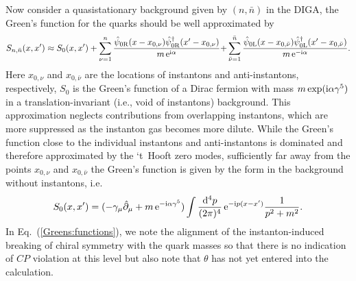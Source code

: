 \documentclass[review]{elsarticle}
\numberwithin{equation}{section}
\numberwithin{table}{section}
\numberwithin{figure}{section}
\begin{document}
Now consider a quasistationary background given by $(n,\bar{n})$ in the DIGA, the Green's function for the quarks should be well approximated by~\cite{Diakonov:1985eg}
\begin{align}
    S_{n,\bar n}(x,x^{\prime})\approx S_{0}(x,x^{\prime})+\sum_{\nu=1}^n\frac{\hat\psi_{0{\rm R}}(x-x_{0,\nu}){\hat\psi^\dagger_{0{\rm R}}}(x^{\prime}-x_{0,\nu})}{m\, {\rm e}^{{\rm i}\alpha}}{+}\sum_{\bar\nu=1}^{\bar n}\frac{\hat\psi_{0{\rm L}}(x-x_{0,\bar\nu}){\hat\psi^\dagger_{0{\rm L}}}(x^{\prime}-x_{0,\bar \nu})}{m\, {\rm e}^{-{\rm i}\alpha}}. 
    \label{Greens:functions}
\end{align}
Here $x_{0,\nu}$ and $x_{0,\bar\nu}$ are the locations of instantons and anti-instantons, respectively, $S_{0}$ is the Green's function of a Dirac fermion with mass $m \exp({\rm i}\alpha\gamma^5)$ in a translation-invariant (i.e., void of instantons) background. This approximation neglects contributions from overlapping instantons, which are more suppressed as the instanton gas becomes more dilute. While the Green's function close to the individual instantons and anti-instantons is dominated and therefore approximated by the `t~Hooft zero modes, sufficiently far away from the points $x_{0,\nu}$ and $x_{0,\bar\nu}$ the Green's function is given by the form in the background without instantons, i.e. 
\begin{align}
    S_{0}(x,x^{\prime}) = (-\gamma_{\mu}\hat{\partial}_\mu + m\, {\rm e}^{-{\rm i}\alpha \gamma^5})\int\frac{{\rm d}^4p}{(2\pi)^4}\, {\rm e}^{-{\rm i}p(x-x^{\prime})}\frac{1}{p^2+m^2} .\label{eq:S0}
\end{align}
In Eq.~(\ref{Greens:functions}), we note the alignment of the instanton-induced breaking of chiral symmetry with the quark masses so that there is no indication of $CP$ violation at this level but also note that $\theta$ has not yet entered into the calculation.
\end{document}
